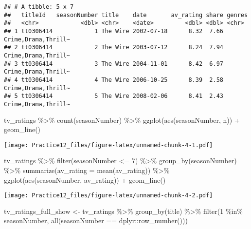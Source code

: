 \documentclass[
]{article}
\newenvironment{Shaded}{\begin{snugshade}}{\end{snugshade}}
\newcommand{\AttributeTok}[1]{\textcolor[rgb]{0.77,0.63,0.00}{#1}}
\newcommand{\DecValTok}[1]{\textcolor[rgb]{0.00,0.00,0.81}{#1}}
\newcommand{\FunctionTok}[1]{\textcolor[rgb]{0.00,0.00,0.00}{#1}}
\newcommand{\NormalTok}[1]{#1}
\newcommand{\OtherTok}[1]{\textcolor[rgb]{0.56,0.35,0.01}{#1}}
\newcommand{\SpecialCharTok}[1]{\textcolor[rgb]{0.00,0.00,0.00}{#1}}
\begin{document}
\begin{verbatim}
## # A tibble: 5 x 7
##   titleId   seasonNumber title    date       av_rating share genres             
##   <chr>            <dbl> <chr>    <date>         <dbl> <dbl> <chr>              
## 1 tt0306414            1 The Wire 2002-07-18      8.32  7.66 Crime,Drama,Thrill~
## 2 tt0306414            2 The Wire 2003-07-12      8.24  7.94 Crime,Drama,Thrill~
## 3 tt0306414            3 The Wire 2004-11-01      8.42  6.97 Crime,Drama,Thrill~
## 4 tt0306414            4 The Wire 2006-10-25      8.39  2.58 Crime,Drama,Thrill~
## 5 tt0306414            5 The Wire 2008-02-06      8.41  2.43 Crime,Drama,Thrill~
\end{verbatim}

\begin{Shaded}
\begin{Highlighting}[]
\NormalTok{tv\_ratings }\SpecialCharTok{\%\textgreater{}\%}
  \FunctionTok{count}\NormalTok{(seasonNumber) }\SpecialCharTok{\%\textgreater{}\%}
  \FunctionTok{ggplot}\NormalTok{(}\FunctionTok{aes}\NormalTok{(seasonNumber, n)) }\SpecialCharTok{+}
  \FunctionTok{geom\_line}\NormalTok{()}
\end{Highlighting}
\end{Shaded}

\texttt{[image: Practice12\_files/figure-latex/unnamed-chunk-4-1.pdf]}

\begin{Shaded}
\begin{Highlighting}[]
\NormalTok{tv\_ratings }\SpecialCharTok{\%\textgreater{}\%}
  \FunctionTok{filter}\NormalTok{(seasonNumber }\SpecialCharTok{\textless{}=} \DecValTok{7}\NormalTok{) }\SpecialCharTok{\%\textgreater{}\%}
  \FunctionTok{group\_by}\NormalTok{(seasonNumber) }\SpecialCharTok{\%\textgreater{}\%}
  \FunctionTok{summarize}\NormalTok{(}\AttributeTok{av\_rating =} \FunctionTok{mean}\NormalTok{(av\_rating)) }\SpecialCharTok{\%\textgreater{}\%}
  \FunctionTok{ggplot}\NormalTok{(}\FunctionTok{aes}\NormalTok{(seasonNumber, av\_rating)) }\SpecialCharTok{+}
  \FunctionTok{geom\_line}\NormalTok{()}
\end{Highlighting}
\end{Shaded}

\texttt{[image: Practice12\_files/figure-latex/unnamed-chunk-4-2.pdf]}

\begin{Shaded}
\begin{Highlighting}[]
\NormalTok{tv\_ratings\_full\_show }\OtherTok{\textless{}{-}}\NormalTok{ tv\_ratings }\SpecialCharTok{\%\textgreater{}\%}
  \FunctionTok{group\_by}\NormalTok{(title) }\SpecialCharTok{\%\textgreater{}\%}
  \FunctionTok{filter}\NormalTok{(}\DecValTok{1} \SpecialCharTok{\%in\%}\NormalTok{ seasonNumber,}
         \FunctionTok{all}\NormalTok{(seasonNumber }\SpecialCharTok{==}\NormalTok{ dplyr}\SpecialCharTok{::}\FunctionTok{row\_number}\NormalTok{())) }
\end{Highlighting}
\end{Shaded}
\end{document}
